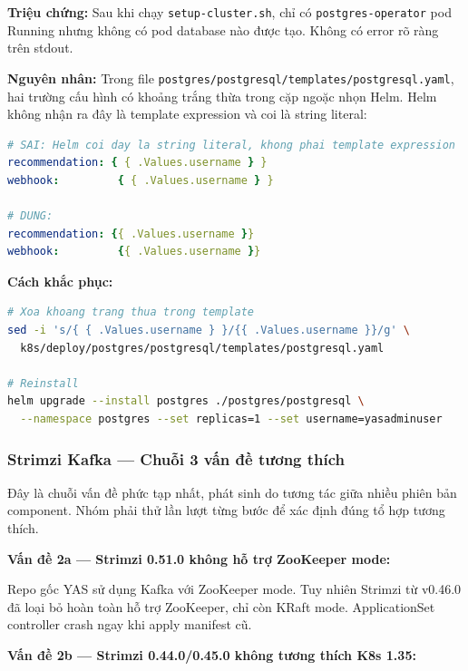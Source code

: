 \textbf{Triệu chứng:} Sau khi chạy \texttt{setup-cluster.sh}, chỉ có \texttt{postgres-operator} pod Running nhưng không có pod database nào được tạo. Không có error rõ ràng trên stdout.

\textbf{Nguyên nhân:} Trong file \texttt{postgres/postgresql/templates/postgresql.yaml}, hai trường cấu hình có khoảng trắng thừa trong cặp ngoặc nhọn Helm. Helm không nhận ra đây là template expression và coi là string literal:

\begin{lstlisting}[language=yaml]
# SAI: Helm coi day la string literal, khong phai template expression
recommendation: { { .Values.username } }
webhook:         { { .Values.username } }

# DUNG:
recommendation: {{ .Values.username }}
webhook:         {{ .Values.username }}
\end{lstlisting}

\textbf{Cách khắc phục:}

\begin{lstlisting}[language=bash]
# Xoa khoang trang thua trong template
sed -i 's/{ { .Values.username } }/{{ .Values.username }}/g' \
  k8s/deploy/postgres/postgresql/templates/postgresql.yaml

# Reinstall
helm upgrade --install postgres ./postgres/postgresql \
  --namespace postgres --set replicas=1 --set username=yasadminuser
\end{lstlisting}

\subsubsection{Strimzi Kafka — Chuỗi 3 vấn đề tương thích}

Đây là chuỗi vấn đề phức tạp nhất, phát sinh do tương tác giữa nhiều phiên bản component. Nhóm phải thử lần lượt từng bước để xác định đúng tổ hợp tương thích.

\vspace{0.5em}
\textbf{Vấn đề 2a — Strimzi 0.51.0 không hỗ trợ ZooKeeper mode:}

Repo gốc YAS sử dụng Kafka với ZooKeeper mode. Tuy nhiên Strimzi từ v0.46.0 đã loại bỏ hoàn toàn hỗ trợ ZooKeeper, chỉ còn KRaft mode. ApplicationSet controller crash ngay khi apply manifest cũ.

\vspace{0.5em}
\textbf{Vấn đề 2b — Strimzi 0.44.0/0.45.0 không tương thích K8s 1.35:}

